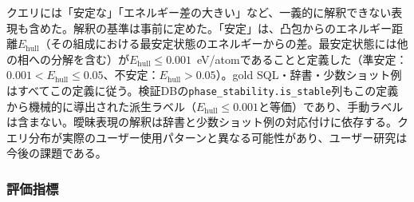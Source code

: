 \documentclass[twocolumn]{interact}
\makeatletter
\def\toprule{\noalign{\ifnum0=`}\fi
  \@aboverulesep=\abovetopsep
  \global\@belowrulesep=\belowrulesep
  \global\@thisruleclass=\@ne
  \@ifnextchar[{\@BTrule}{\@BTrule[\heavyrulewidth]}}
\def\midrule{\noalign{\ifnum0=`}\fi
  \@aboverulesep=\aboverulesep
  \global\@belowrulesep=\belowrulesep
  \global\@thisruleclass=\@ne
  \@ifnextchar[{\@BTrule}{\@BTrule[\lightrulewidth]}}
\def\bottomrule{\noalign{\ifnum0=`}\fi
  \@aboverulesep=\aboverulesep
  \global\@belowrulesep=\belowbottomsep
  \global\@thisruleclass=\@ne
  \@ifnextchar[{\@BTrule}{\@BTrule[\heavyrulewidth]}}
\makeatother
\begin{document}
\begin{table}[t]
  \centering
  \caption{主評価245クエリの内訳（重複なしの分割）。クエリIDの接頭辞は同梱データセットのものである。「再掲」列は、同じクエリ群がセクション~\ref{sec:additional_validation}で別ランの結果として独立に報告されることを示す。一般化バリアントB/C/D（計55クエリ）と非翻訳英語25クエリは245クエリに含まれない別コーパスである。}
  \label{tab:main_partition}
  \footnotesize
\end{table}

クエリには「安定な」「エネルギー差の大きい」など、一義的に解釈できない表現も含めた。解釈の基準は事前に定めた。「安定」は、凸包からのエネルギー距離$E_\text{hull}$（その組成における最安定状態のエネルギーからの差。最安定状態には他の相への分解を含む）が$E_\text{hull} \leq 0.001$~eV/atomであることと定義した（準安定：$0.001 < E_\text{hull} \leq 0.05$、不安定：$E_\text{hull} > 0.05$）。gold SQL・辞書・少数ショット例はすべてこの定義に従う。検証DBの\texttt{phase\_stability.is\_stable}列もこの定義から機械的に導出された派生ラベル（$E_\text{hull} \leq 0.001$と等価）であり、手動ラベルは含まない。曖昧表現の解釈は辞書と少数ショット例の対応付けに依存する。クエリ分布が実際のユーザー使用パターンと異なる可能性があり、ユーザー研究は今後の課題である。


\subsubsection{評価指標}
\label{sec:metrics}
\end{document}

